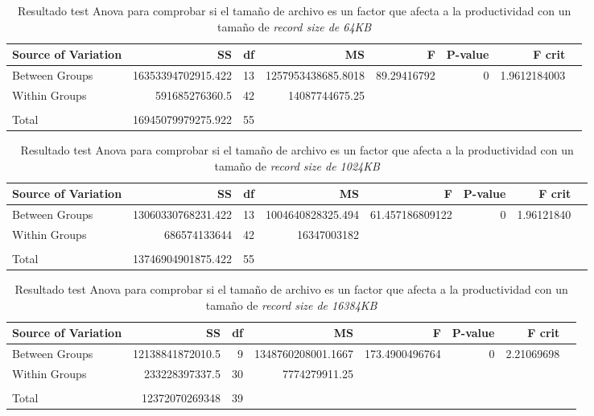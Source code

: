 \begin{table}[H]\centering
\scriptsize
\begin{tabular}{lrrrrrrr}\toprule
Source of Variation &SS &df &MS &F &P-value &F crit \\\midrule
Between Groups &16353394702915.422 &13 &1257953438685.8018 &89.29416792 &0 &1.9612184003 \\
Within Groups &591685276360.5 &42 &14087744675.25 & & & \\
& & & & & & \\
Total &16945079979275.922 &55 & & & & \\
\bottomrule
\end{tabular}
\caption{Resultado test Anova para comprobar si el tamaño de archivo es un factor que afecta a la productividad con un tamaño de \textit{record size de 64KB}}\label{tab: }
\end{table}

\begin{table}[H]\centering
\scriptsize
\begin{tabular}{lrrrrrrr}\toprule
Source of Variation &SS &df &MS &F &P-value &F crit \\\midrule
Between Groups &13060330768231.422 &13 &1004640828325.494 &61.457186809122 &0 &1.96121840 \\
Within Groups &686574133644 &42 &16347003182 & & & \\
& & & & & & \\
Total &13746904901875.422 &55 & & & & \\
\bottomrule
\end{tabular}
\caption{Resultado test Anova para comprobar si el tamaño de archivo es un factor que afecta a la productividad con un tamaño de \textit{record size de 1024KB}}\label{tab: }
\end{table}

\begin{table}[H]\centering
\scriptsize
\begin{tabular}{lrrrrrrr}\toprule
Source of Variation &SS &df &MS &F &P-value &F crit \\\midrule
Between Groups &12138841872010.5 &9 &1348760208001.1667 &173.4900496764 &0 &2.21069698 \\
Within Groups &233228397337.5 &30 &7774279911.25 & & & \\
& & & & & & \\
Total &12372070269348 &39 & & & & \\
\bottomrule
\end{tabular}
\caption{Resultado test Anova para comprobar si el tamaño de archivo es un factor que afecta a la productividad con un tamaño de \textit{record size de 16384KB}}\label{tab: }
\end{table}

